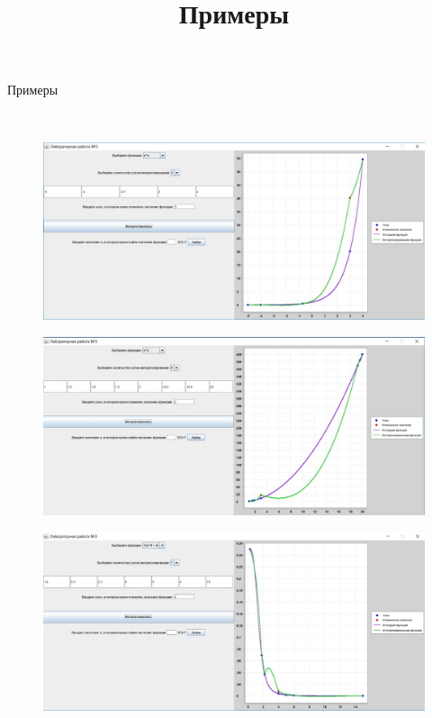 \title{Примеры}{\begin{center}
    Примеры
\end{center}} \\
\begin{figure}[H]
\includegraphics[width = 1\textwidth]{1.jpg}
\end{figure} 

\begin{figure}[H]
\includegraphics[width = 1\textwidth]{2.jpg}
\end{figure} 

\begin{figure}[H]
\includegraphics[width = 1\textwidth]{3.jpg}
\end{figure} 



